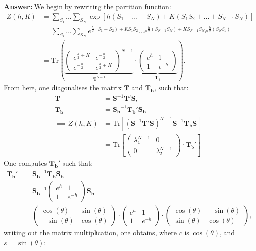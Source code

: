 \documentclass[a4paper]{article}
\newcommand{\trace}{\text{Tr}}
\newcommand{\newparagraph}{\vspace{.5cm}\noindent}
\begin{document}
\newparagraph
\textbf{Answer:} We begin by rewriting the partition function:
\begin{align*}
    Z(h, K) &= \sum_{S_1}...\sum_{S_N} \exp\left[h\left(S_1 + ...+ S_N\right) + K\left(S_1S_2 + ... + S_{N-1}S_N\right)\right]\\
    &= \sum_{S_1}...\sum_{S_N}e^{\frac{h}{2}(S_1 + S_2) + KS_1S_2}...e^{\frac{h}{2}(S_{N - 1}S_N) + KS_{N-1}S_N}e^{\frac{h}{2}(S_NS_1)}\\
    &= \trace\left(\underbrace{\begin{pmatrix}
        e^{\frac{h}{2} + K} & e^{-\frac{h}{2}}\\
        e^{-\frac{h}{2}} & e^{\frac{h}{2} + K}
    \end{pmatrix}^{N-1}}_{\mathbf{T}^{N-1}}\cdot\underbrace{\begin{pmatrix}
        e^h & 1\\
        1 & e^{-h}
    \end{pmatrix}}_{\mathbf{T_b}}\right).
\end{align*}From here, one diagonalises the matrix $\mathbf{T}$ and $\mathbf{T_b}$, such that:
\begin{align*}
    \mathbf{T} &= \mathbf{S}^{-1}\mathbf{T}'\mathbf{S},\\
    \mathbf{T_b} &= \mathbf{S_b}^{-1}\mathbf{T_b}'\mathbf{S_b}\\
    \implies Z(h, K) &= \trace\left[\left(\mathbf{S}^{-1}\mathbf{T}'\mathbf{S}\right)^{N-1}\mathbf{S}^{-1}\mathbf{T_b}\mathbf{S}\right]\\
    &= \trace\left[\begin{pmatrix}
        \lambda_1^{N-1} & 0\\
        0 & \lambda_2^{N-1}
    \end{pmatrix}\cdot\mathbf{T_b}'\right]
\end{align*}One computes $\mathbf{T_b}'$ such that:
\begin{align*}
    \mathbf{T_b}' &= \mathbf{S_b}^{-1}\mathbf{T_b}\mathbf{S_b}\\
    &= \mathbf{S_b}^{-1}\begin{pmatrix}
        e^h & 1\\
        1 & e^{-h}
    \end{pmatrix}\mathbf{S_b}\\
    &= \begin{pmatrix}
        \cos(\theta) & \sin(\theta)\\
        -\sin(\theta) & \cos(\theta)
    \end{pmatrix}\cdot\begin{pmatrix}
        e^h & 1\\
        1 & e^{-h}
    \end{pmatrix}\cdot\begin{pmatrix}
        \cos(\theta) & -\sin(\theta)\\
        \sin(\theta) & \cos(\theta)
    \end{pmatrix},
\end{align*}writing out the matrix multiplication, one obtains, where $c$ is $\cos(\theta)$, and $s = \sin(\theta)$:
\end{document}
